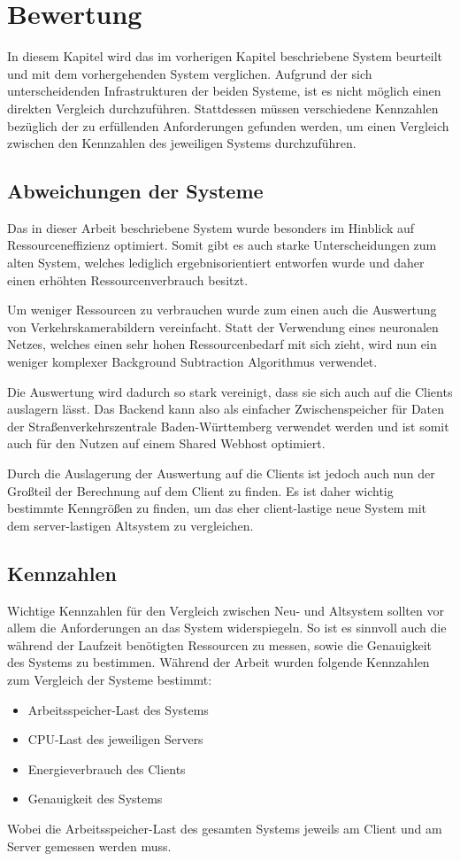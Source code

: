 \chapter{Bewertung}
In diesem Kapitel wird das im vorherigen Kapitel beschriebene System beurteilt und mit dem vorhergehenden System verglichen.
Aufgrund der sich unterscheidenden Infrastrukturen der beiden Systeme, ist es nicht möglich einen direkten Vergleich durchzuführen.
Stattdessen müssen verschiedene Kennzahlen bezüglich der zu erfüllenden Anforderungen gefunden werden, um einen Vergleich zwischen den Kennzahlen des jeweiligen Systems durchzuführen.

\section{Abweichungen der Systeme}
Das in dieser Arbeit beschriebene System wurde besonders im Hinblick auf Ressourceneffizienz optimiert.
Somit gibt es auch starke Unterscheidungen zum alten System, welches lediglich ergebnisorientiert entworfen wurde und daher einen erhöhten Ressourcenverbrauch besitzt.

Um weniger Ressourcen zu verbrauchen wurde zum einen auch die Auswertung von Verkehrskamerabildern vereinfacht.
Statt der Verwendung eines neuronalen Netzes, welches einen sehr hohen Ressourcenbedarf mit sich zieht, wird nun ein weniger komplexer Background Subtraction Algorithmus verwendet.

Die Auswertung wird dadurch so stark vereinigt, dass sie sich auch auf die Clients auslagern lässt.
Das Backend kann also als einfacher Zwischenspeicher für Daten der Straßenverkehrszentrale Baden-Württemberg verwendet werden und ist somit auch für den Nutzen auf einem Shared Webhost optimiert.

Durch die Auslagerung der Auswertung auf die Clients ist jedoch auch nun der Großteil der Berechnung auf dem Client zu finden.
Es ist daher wichtig bestimmte Kenngrößen zu finden, um das eher client-lastige neue System mit dem server-lastigen Altsystem zu vergleichen.

\section{Kennzahlen}
Wichtige Kennzahlen für den Vergleich zwischen Neu- und Altsystem sollten vor allem die Anforderungen an das System widerspiegeln.
So ist es sinnvoll auch die während der Laufzeit benötigten Ressourcen zu messen, sowie die Genauigkeit des Systems zu bestimmen.
Während der Arbeit wurden folgende Kennzahlen zum Vergleich der Systeme bestimmt:
\begin{itemize}
\item{Arbeitsspeicher-Last des Systems}
\item{CPU-Last des jeweiligen Servers}
\item{Energieverbrauch des Clients}
\item{Genauigkeit des Systems}
\end{itemize}
Wobei die Arbeitsspeicher-Last des gesamten Systems jeweils am Client und am Server gemessen werden muss.

